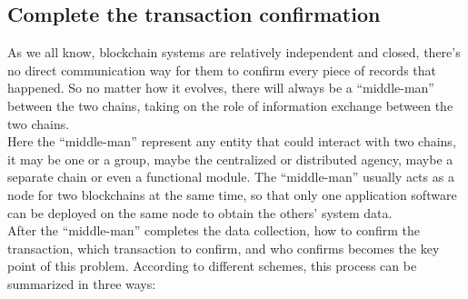 \subsection{Complete the transaction confirmation}
\noindent As we all know, blockchain systems are relatively independent and closed, there's no direct communication way for them to confirm every piece of records that happened. So no matter how it evolves, there will always be a ``middle-man'' between the two chains, taking on the role of information exchange between the two chains.\\
\noindent Here the ``middle-man'' represent any entity that could interact with two chains, it may be one or a group, maybe the centralized or distributed agency, maybe a separate chain or even a functional module. The ``middle-man'' usually acts as a node for two blockchains at the same time, so that only one application software can be deployed on the same node to obtain the others' system data.\\
\noindent After the ``middle-man'' completes the data collection, how to confirm the transaction, which transaction to confirm, and who confirms becomes the key point of this problem. According to different schemes, this process can be summarized in three ways:
